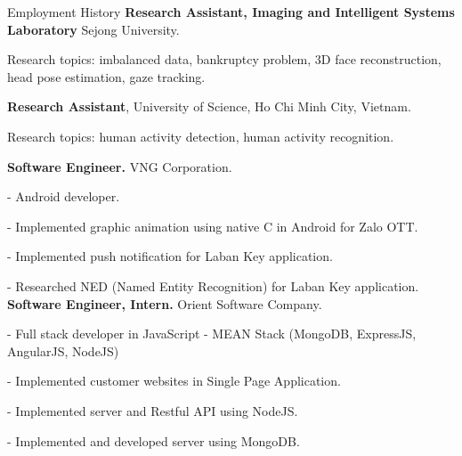 \begin{rubric}{Employment History}
\entry*[03/2017 -- 03/2019]%
	\textbf{Research Assistant, Imaging and Intelligent Systems Laboratory} Sejong University.\par 
	Research topics: imbalanced data, bankruptcy problem, 3D face reconstruction, head pose estimation, gaze tracking.
	

\entry*[02/2016 -- 08/2016]%
	\textbf{Research Assistant}, University of Science, Ho Chi Minh City, Vietnam. \par 
	Research topics: human activity detection, human activity recognition.
	
\entry*[03/2016 --  03/2017]%
	\textbf{Software Engineer.} VNG Corporation. \par
	- Android developer. \par 
	- Implemented graphic animation using native C in Android for Zalo OTT.\par
	- Implemented push notification for Laban Key application. \par 
	- Researched NED (Named Entity Recognition) for Laban Key application. 
%
%
\entry*[05/2015 -- 07/2015]%
	\textbf{Software Engineer, Intern.} Orient Software Company. \par 
	- Full stack developer in JavaScript - MEAN Stack (MongoDB, ExpressJS, AngularJS, NodeJS) \par
	- Implemented customer websites in Single Page Application. \par 
	- Implemented server and Restful API using NodeJS. \par 
	- Implemented and developed server using MongoDB.\par 


%
%


%
\end{rubric}